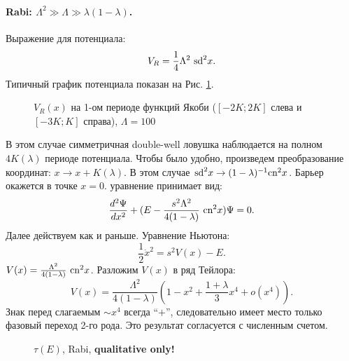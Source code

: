\documentclass[12pt]{article}
\begin{document}
\paragraph{Rabi: $\Lambda^2 \gg \Lambda \gg \lambda(1 - \lambda)$.}
Выражение для потенциала:
%
\begin{equation}
V_R = \frac{1}{4} \Lambda^2 ~\textrm{sd}^2 x.
\end{equation}
%
Типичный график потенциала показан на Рис. \ref{pic:potential_rabi}.
%
\begin{figure}[Ht!]
\caption{$V_R (x)$ на 1-ом периоде функций Якоби ($[-2K; 2K]$ слева и $[-3K; K]$ справа), $\Lambda = 100$}
\label{pic:potential_rabi}
\end{figure}
%
В этом случае симметричная double-well ловушка наблюдается на полном $4K(\lambda)$ периоде потенциала.
Чтобы было удобно, произведем преобразование координат: $x \to x + K(\lambda)$.
В этом случае $\textrm{sd}^2 x \to (1 - \lambda)^{-1} \textrm{cn}^2 x$.
Барьер окажется в точке $x = 0$.
уравнение принимает вид:
%
\begin{equation}
\frac{d^2 \Psi}{dx^2} + (E - \frac{s^2 \Lambda^2}{4 (1 - \lambda)} ~\textrm{cn}^2 x) \Psi = 0.
\end{equation}
%
Далее действуем как и раньше.
Уравнение Ньютона:
%
\begin{equation}
\frac{1}{2} \dot{x}^2 = s^2 V(x) - E.
\end{equation}
%
$V(x) = \frac{\Lambda^2}{4(1 - \lambda)} ~\textrm{cn}^2 x$.
Разложим $V(x)$ в ряд Тейлора:
%
\begin{equation}
V(x) = \frac{\Lambda^2}{4(1 - \lambda)} (1 - x^2 + \frac{1 + \lambda}{3} x^4 + o(x^4)).
\end{equation}
%
Знак перед слагаемым $\sim x^4$ всегда ``$+$'', следовательно имеет место только фазовый переход 2-го рода.
Это результат согласуется с численным счетом.
%
\begin{figure}[Ht!]
\caption{$\tau(E)$, Rabi, {\bf qualitative only!}}
\end{figure}
%
\end{document}
